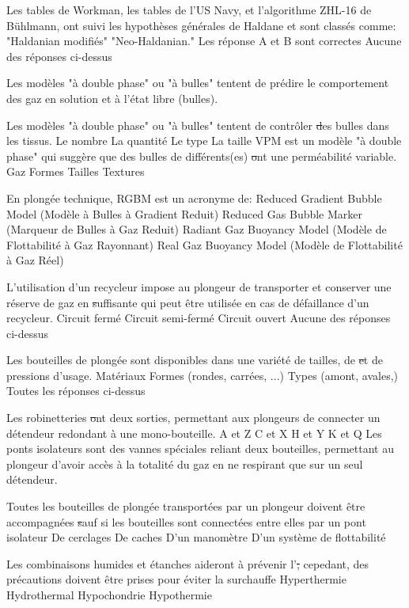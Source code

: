 \documentclass[english,10pt,twoside]{article}
\begin{document}
\begin{outline}
		\1 Les tables de Workman, les tables de l'US Navy, et l'algorithme ZHL-16 de Bühlmann, ont suivi les hypothèses générales de Haldane et sont classés comme:
			\2 "Haldanian modifiés"
			\2 "Neo-Haldanian."
			\2 Les réponse A et B sont correctes
			\2 Aucune des réponses ci-dessus

		\1 Les modèles "à double phase" ou "à bulles" tentent de prédire le comportement des gaz en solution et à l'état libre (bulles).\vf

		\1 Les modèles "à double phase" ou "à bulles" tentent de contrôler \st des bulles dans les tissus.
			\2 Le nombre
			\2 La quantité
			\2 Le type
			\2 La taille
		\1 VPM est un modèle "à double phase" qui suggère que des bulles de différents(es) \st ont une perméabilité variable.
			\2 Gaz
			\2 Formes
			\2 Tailles
			\2 Textures

		\1 En plongée technique, RGBM est un acronyme de:
			\2 Reduced Gradient Bubble Model (Modèle à Bulles à Gradient Reduit)
			\2 Reduced Gas Bubble Marker (Marqueur de Bulles à Gaz Reduit)
			\2 Radiant Gaz Buoyancy Model (Modèle de Flottabilité à Gaz Rayonnant)
			\2 Real Gaz Buoyancy Model (Modèle de Flottabilité à Gaz Réel)

		\1 L'utilisation d'un recycleur impose au plongeur de transporter et conserver une réserve de gaz en \st suffisante qui peut être utilisée en cas de défaillance d'un recycleur.
			\2 Circuit fermé
			\2 Circuit semi-fermé
			\2 Circuit ouvert
			\2 Aucune des réponses ci-dessus

		\1 Les bouteilles de plongée sont disponibles dans une variété de tailles, de \st et de pressions d'usage.
			\2 Matériaux
			\2 Formes (rondes, carrées, ...)
			\2 Types (amont, avales,)
			\2 Toutes les réponses ci-dessus


		\1 Les robinetteries \st ont deux sorties, permettant aux plongeurs de connecter un détendeur redondant à une mono-bouteille.
			\2 A et Z
			\2 C et X
			\2 H et Y
			\2 K et Q
		\1 Les ponts isolateurs sont des vannes spéciales reliant deux bouteilles, permettant au plongeur d'avoir accès à la totalité du gaz en ne respirant que sur un seul détendeur.\vf

		\1 Toutes les bouteilles de plongée transportées par un plongeur doivent être accompagnées \st sauf si les bouteilles sont connectées entre elles par un pont isolateur
			\2 De cerclages
			\2 De caches
			\2 D'un manomètre
			\2 D'un système de flottabilité

		\1 Les combinaisons humides et étanches aideront à prévenir l'\st; cepedant, des précautions doivent être prises pour éviter la surchauffe
			\2 Hyperthermie
			\2 Hydrothermal
			\2 Hypochondrie
			\2 Hypothermie


\end{outline}
\end{document}
